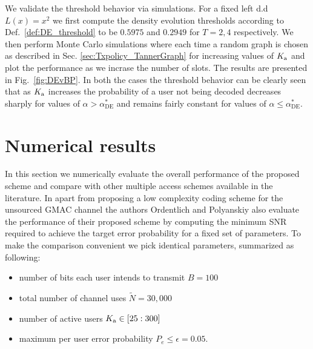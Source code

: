 We validate the threshold behavior via simulations.  For a fixed left d.d $L(x)=x^2$ we first compute the density evolution thresholds according to Def.~\ref{def:DE_threshold} to be $0.5975$ and $0.2949$ for $T=2,4$ respectively. We then perform Monte Carlo simulations where each time a random graph is chosen as described in Sec. \ref{sec:Txpolicy_TannerGraph} for increasing values of $K_{\text{a}}$ and plot the performance as we incrase the number of slots. The results are presented in Fig.~\ref{fig:DEvBP}. In both the cases the threshold behavior can be clearly seen that as $K_{\text{a}}$ increases the probability of a user not being decoded decreases sharply for values of $\alpha>\alpha_{\text{DE}}^*$ and remains fairly constant for values of $\alpha\leq\alpha_{\text{DE}}^*$.

\section{Numerical results}
In this section we numerically evaluate the overall performance of the proposed scheme and compare with other multiple access schemes available in the literature. In \cite{ordentlich2017low} apart from proposing a low complexity coding scheme for the unsourced GMAC channel the authors Ordentlich and Polyanskiy also evaluate the performance of their proposed scheme by computing the minimum SNR required to achieve the target error probability for a fixed set of parameters. To make the comparison convenient we pick identical parameters, summarized as following:
\begin{itemize}
\item number of bits each user intends to transmit $B=100$
\item total number of channel uses $\tilde{N}=30,000$
\item number of active users $K_{\text{a}}\in [25:300]$
\item maximum per user error probability $P_e\leq \epsilon=0.05$.
\end{itemize}

